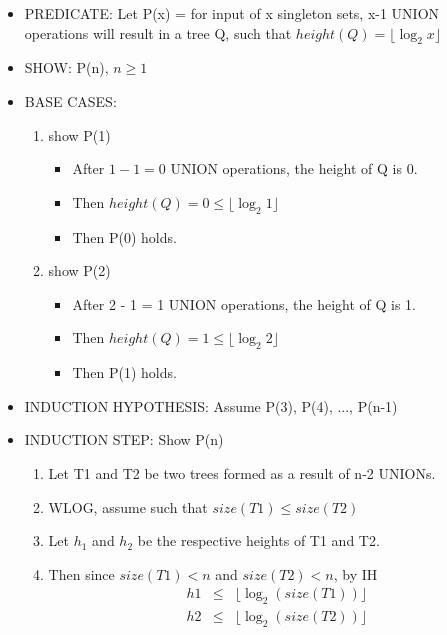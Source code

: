 \documentclass[11pt]{article}
\begin{document}
\begin{enumerate}
\begin{enumerate}[a)]
\begin{itemize}
					\item PREDICATE: Let P(x) = for input of x singleton sets, x-1 UNION operations will result in a tree Q, such that $height(Q) = \lfloor \log_2 x \rfloor$
					\item SHOW: P(n), $n \ge 1$
					\item BASE CASES: 
						\begin{enumerate}[$\circ$]
							\item show P(1)
								\begin{itemize}
									\item After $1 - 1 = 0$ UNION operations, the height of Q is 0. 
									\item Then $height(Q) = 0 \le \lfloor \log_2 1 \rfloor$
									\item Then P(0) holds.
								\end{itemize}
							\item show P(2)
								\begin{itemize}
									\item After 2 - 1 = 1 UNION operations, the height of Q is 1.
									\item Then $height(Q) = 1 \le \lfloor \log_2 2\rfloor$
									\item Then P(1) holds.
								\end{itemize}
						\end{enumerate}
					\item INDUCTION HYPOTHESIS: Assume P(3), P(4), ..., P(n-1)
					\item INDUCTION STEP: Show P(n)
						\begin{enumerate}[$\circ$]
							\item Let T1 and T2 be two trees formed as a result of n-2 UNIONs. 
							\item WLOG, assume such that $size(T1) \le size(T2)$
							\item Let $h_1$ and $h_2$ be the respective heights of T1 and T2.
							
							\item Then since $size(T1) < n$ and $size(T2) < n$, by IH 
							\begin{eqnarray*}
								h1 & \le & \lfloor \log_2 (size(T1)) \rfloor  \\
             					h2 & \le & \lfloor \log_2 (size(T2)) \rfloor 
							\end{eqnarray*}


\end{enumerate}
\end{itemize}
\end{enumerate}
\end{enumerate}
\end{document}
